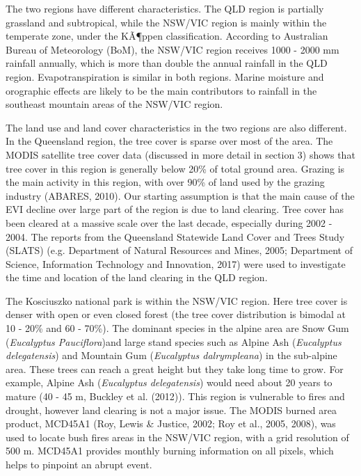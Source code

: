 \documentclass[fleqn,10pt,lineno]{wlpeerj} %
\theoremstyle{definition}
\theoremstyle{definition}
\theoremstyle{definition}
\theoremstyle{remark}
\begin{document}
The two regions have different characteristics. The QLD region is
partially grassland and subtropical, while the NSW/VIC region is mainly
within the temperate zone, under the KÃ¶ppen classification. According
to Australian Bureau of Meteorology (BoM), the NSW/VIC region receives
1000 - 2000 mm rainfall annually, which is more than double the annual
rainfall in the QLD region. Evapotranspiration is similar in both
regions. Marine moisture and orographic effects are likely to be the
main contributors to rainfall in the southeast mountain areas of the
NSW/VIC region.

The land use and land cover characteristics in the two regions are also
different. In the Queensland region, the tree cover is sparse over most
of the area. The MODIS satellite tree cover data (discussed in more
detail in section 3) shows that tree cover in this region is generally
below 20\% of total ground area. Grazing is the main activity in this
region, with over 90\% of land used by the grazing industry (ABARES,
2010). Our starting assumption is that the main cause of the EVI decline
over large part of the region is due to land clearing. Tree cover has
been cleared at a massive scale over the last decade, especially during
2002 - 2004. The reports from the Queensland Statewide Land Cover and
Trees Study (SLATS) (e.g. Department of Natural Resources and Mines,
2005; Department of Science, Information Technology and Innovation,
2017) were used to investigate the time and location of the land
clearing in the QLD region.

The Kosciuszko national park is within the NSW/VIC region. Here tree
cover is denser with open or even closed forest (the tree cover
distribution is bimodal at 10 - 20\% and 60 - 70\%). The dominant
species in the alpine area are Snow Gum (\emph{Eucalyptus
Pauciflora})and large stand species such as Alpine Ash (\emph{Eucalyptus
delegatensis}) and Mountain Gum (\emph{Eucalyptus dalrympleana}) in the
sub-alpine area. These trees can reach a great height but they take long
time to grow. For example, Alpine Ash (\emph{Eucalyptus delegatensis})
would need about 20 years to mature (40 - 45 m, Buckley et al. (2012)).
This region is vulnerable to fires and drought, however land clearing is
not a major issue. The MODIS burned area product, MCD45A1 (Roy, Lewis \&
Justice, 2002; Roy et al., 2005, 2008), was used to locate bush fires
areas in the NSW/VIC region, with a grid resolution of 500 m. MCD45A1
provides monthly burning information on all pixels, which helps to
pinpoint an abrupt event.
\end{document}
